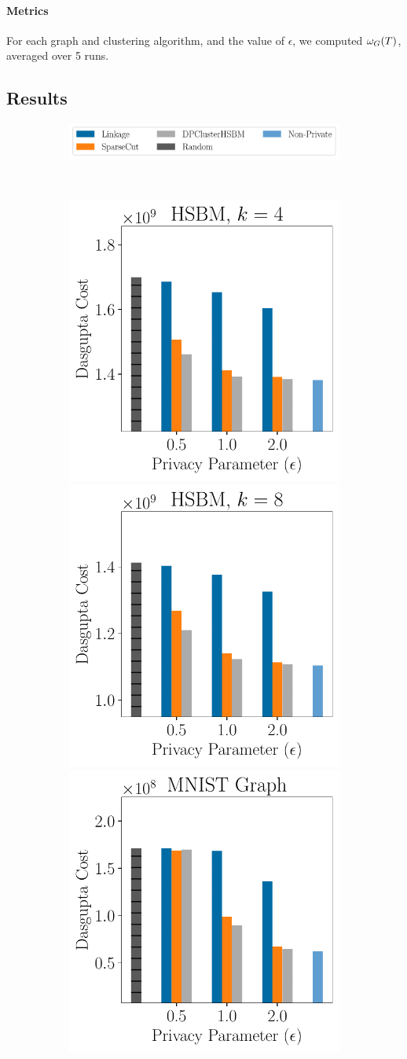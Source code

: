 \paragraph{Metrics}
For each graph and clustering algorithm, and the value of $\epsilon$, we computed $\omega_G(T)$, averaged over 5 runs.

\subsection{Results}\label{sec:exp-discuss}
\begin{figure}
    \begin{subfigure}[b]{\linewidth}
            \centering\includegraphics[width=0.8\linewidth]{plots/legend.pdf}
    \end{subfigure}\\
    \begin{subfigure}[b]{\linewidth}
        \centering
        \includegraphics[width=0.48\linewidth]{plots/syn_2048_4_cost.pdf}
        \includegraphics[width=0.48\linewidth]{plots/syn_2048_8_cost.pdf}
        \includegraphics[width=0.48\linewidth]{plots/mnist_cost.pdf}

\end{subfigure}
\end{figure}
